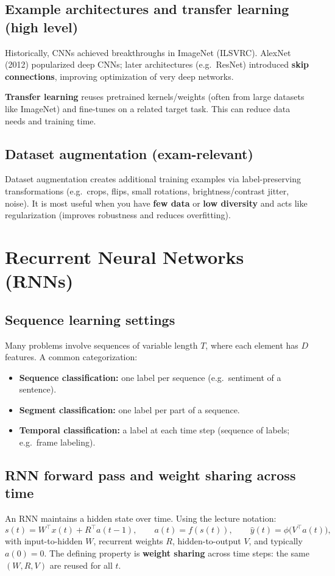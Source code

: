 \documentclass[11pt, oneside]{book}
\newcommand{\1}{\ind}                       %
\begin{document}
\subsection{Example architectures and transfer learning (high level)}
Historically, CNNs achieved breakthroughs in ImageNet (ILSVRC). AlexNet (2012) popularized deep CNNs; later architectures (e.g.\ ResNet) introduced \textbf{skip connections}, improving optimization of very deep networks.

\textbf{Transfer learning} reuses pretrained kernels/weights (often from large datasets like ImageNet) and fine-tunes on a related target task. This can reduce data needs and training time.

\subsection{Dataset augmentation (exam-relevant)}
Dataset augmentation creates additional training examples via label-preserving transformations
(e.g.\ crops, flips, small rotations, brightness/contrast jitter, noise).
It is most useful when you have \textbf{few data} or \textbf{low diversity} and acts like regularization
(improves robustness and reduces overfitting).

\section{Recurrent Neural Networks (RNNs)}
\subsection{Sequence learning settings}
Many problems involve sequences of variable length $T$, where each element has $D$ features.
A common categorization:
\begin{itemize}
  \item \textbf{Sequence classification:} one label per sequence (e.g.\ sentiment of a sentence).
  \item \textbf{Segment classification:} one label per part of a sequence.
  \item \textbf{Temporal classification:} a label at each time step (sequence of labels; e.g.\ frame labeling).
\end{itemize}

\subsection{RNN forward pass and weight sharing across time}
An RNN maintains a hidden state over time. Using the lecture notation:
\[
s(t)=W^\top x(t)+R^\top a(t-1),\qquad
a(t)=f(s(t)),\qquad
\hat y(t)=\phi\big(V^\top a(t)\big),
\]
with input-to-hidden $W$, recurrent weights $R$, hidden-to-output $V$, and typically $a(0)=0$.
The defining property is \textbf{weight sharing} across time steps: the same $(W,R,V)$ are reused for all $t$.
\end{document}
